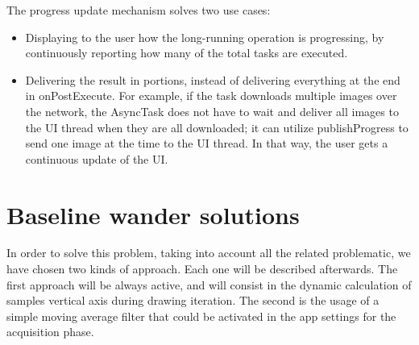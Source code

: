 The progress update mechanism solves two use cases:
\begin{itemize}
	\item Displaying to the user how the long-running operation is progressing, by continuously reporting how many of the total tasks are executed.
	\item Delivering the result in portions, instead of delivering everything at the end in onPostExecute. For example, if the task downloads multiple images over the network, the AsyncTask does not have to wait and deliver all images to the UI thread when they are all downloaded; it can utilize publishProgress to send one image at the time to the UI thread. In that way, the user gets a continuous update of the UI.\cite{ref19}
\end{itemize}

\section{Baseline wander solutions}
In order to solve this problem, taking into account all the related problematic, we have chosen two kinds of approach. Each one will be described afterwards. The first approach will be always active, and will consist in the dynamic calculation of samples vertical axis during drawing iteration. The second is the usage of a simple moving average filter that could be activated in the app settings for the acquisition phase.


